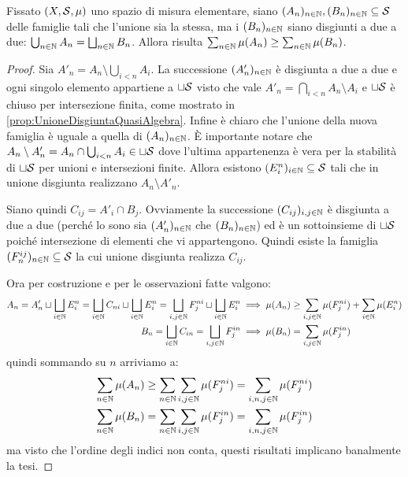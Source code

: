 \begin{lemma}\label{lemma:CoerenzaPremisura}
	Fissato $(X,\S,\mu)$ uno spazio di misura elementare, siano $(A_n)_{n\in\N},(B_n)_{n\in\N}\subseteq\S$ delle famiglie tali che l'unione sia la stessa, ma i $(B_n)_{n\in\N}$ siano disgiunti a due a due: $\bigcup_{n\in\N}A_n=\bigsqcup_{n\in\N}B_n$.
	Allora risulta $\sum_{n\in\N}\mu(A_n)\ge \sum_{n\in\N}\mu(B_n)$.
\end{lemma}
\begin{proof}
	Sia $A'_n=A_n\setminus\bigcup_{i<n}A_i$. La successione $(A'_n)_{n\in\N}$ è disgiunta a due a due e ogni singolo elemento appartiene a $\sqcup \S$ visto che vale $A'_n=\bigcap_{i<n}A_n\setminus A_i$ e $\sqcup \S$ è chiuso per intersezione finita, come mostrato in \cref{prop:UnioneDisgiuntaQuasiAlgebra}. Infine è chiaro che l'unione della nuova famiglia è uguale a quella di $(A_n)_{n\in\N}$.
	È importante notare che $A_n\setminus A'_n=A_n\cap\bigcup_{i<n}A_i\in\sqcup\S$ dove l'ultima appartenenza è vera per la stabilità di $\sqcup\S$ per unioni e intersezioni finite. Allora esistono $(E^n_i)_{i\in\N}\subseteq\S$ tali che in unione disgiunta realizzano $A_n\setminus A'_n$.
	
	Siano quindi $C_{ij}=A'_i\cap B_j$. Ovviamente la successione $(C_{ij})_{i,j\in\N}$ è disgiunta a due a due (perché lo sono sia $(A'_n)_{n\in\N}$ che $(B_n)_{n\in\N}$) ed è un sottoinsieme di $\sqcup\S$ poiché intersezione di elementi che vi appartengono. Quindi esiste la famiglia $(F^{ij}_n)_{n\in\N}\subseteq\S$ la cui unione disgiunta realizza $C_{ij}$.
	
	Ora per costruzione e per le osservazioni fatte valgono:
	\begin{align*}
		A_n= A'_n\sqcup \bigsqcup_{i\in\N}E^n_i=\bigsqcup_{i\in\N}C_{ni}\sqcup \bigsqcup_{i\in\N}E^n_i
		=\bigsqcup_{i,j\in\N}F^{ni}_j\sqcup \bigsqcup_{i\in\N}E^n_i
		&\implies \mu(A_n)\ge\sum_{i,j\in\N}\mu(F^{ni}_j)+\sum_{i\in\N}\mu(E^n_i)\\
		B_n=\bigsqcup_{i\in\N}C_{in}=\bigsqcup_{i,j\in\N}F^{in}_j
		&\implies \mu(B_n)=\sum_{i,j\in\N}\mu(F^{in}_j)
	\end{align*}
	quindi sommando su $n$ arriviamo a:
	\begin{align*}
		\sum_{n\in\N}\mu(A_n)&\ge \sum_{n\in\N}\sum_{i,j\in\N}\mu(F^{ni}_j)
		=\sum_{i,n,j\in\N}\mu(F^{ni}_j)\\
		\sum_{n\in\N}\mu(B_n)&=\sum_{n\in\N}\sum_{i,j\in\N}\mu(F^{in}_j)=\sum_{i,n,j\in\N}\mu(F^{in}_j)
	\end{align*}
	ma visto che l'ordine degli indici non conta, questi risultati implicano banalmente la tesi.


\end{proof}



